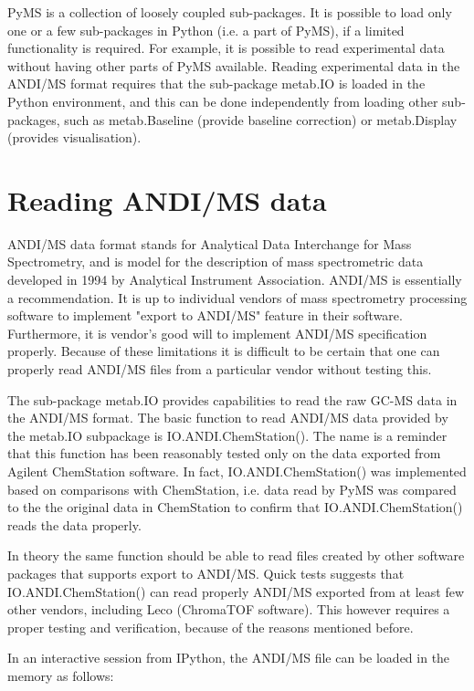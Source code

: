 PyMS is a collection of loosely coupled sub-packages. It is possible
to load only one or a few sub-packages in Python (i.e. a part of PyMS),
if a limited functionality is required. For example, it is possible
to read experimental data without having other parts of PyMS
available. Reading experimental data in the ANDI/MS format requires
that the sub-package metab.IO is loaded in the Python environment,
and this can be done independently from loading other sub-packages,
such as metab.Baseline (provide baseline correction) or metab.Display
(provides visualisation).

\section{Reading ANDI/MS data}

ANDI/MS data format stands for Analytical Data Interchange for Mass
Spectrometry, and is model for the description of mass spectrometric
data developed in 1994 by Analytical Instrument Association. ANDI/MS 
is essentially a recommendation. It is up to individual vendors of
mass spectrometry processing software to implement "export to ANDI/MS"
feature in their software. Furthermore, it is vendor's good will to
implement ANDI/MS specification properly. Because of these limitations
it is difficult to be certain that one can properly read ANDI/MS
files from a particular vendor without testing this.

The sub-package metab.IO provides capabilities to read the raw GC-MS
data in the ANDI/MS format. The basic function to read ANDI/MS data
provided by the metab.IO subpackage is IO.ANDI.ChemStation(). The
name is a reminder that this function has been reasonably tested
only on the data exported from Agilent ChemStation software.
In fact, IO.ANDI.ChemStation() was implemented based on comparisons
with ChemStation, i.e. data read by PyMS was compared to the
the original data in ChemStation to confirm that IO.ANDI.ChemStation()
reads the data properly.

In theory the same function should be able to read files created by
other software packages that supports export to ANDI/MS. Quick tests
suggests that IO.ANDI.ChemStation() can read properly ANDI/MS exported
from at least few other vendors, including Leco (ChromaTOF software).
This however requires a proper testing and verification, because of
the reasons mentioned before.
 
In an interactive session from IPython, the ANDI/MS file can be loaded
in the memory as follows:

